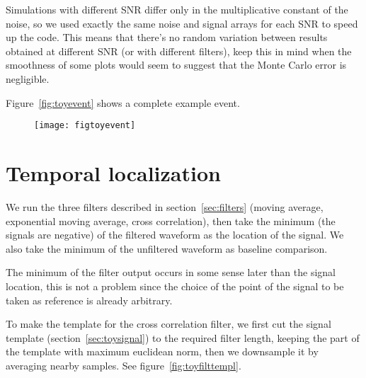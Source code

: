 
Simulations with different SNR differ only in the multiplicative constant of
the noise, so we used exactly the same noise and signal arrays for each SNR to
speed up the code. This means that there's no random variation between results
obtained at different SNR (or with different filters), keep this in mind when
the smoothness of some plots would seem to suggest that the Monte Carlo error
is negligible.

Figure~\ref{fig:toyevent} shows a complete example event.

\begin{figure}
    \hspace{-0.15\textwidth}
    \texttt{[image: figtoyevent]}
    

\end{figure}

\section{Temporal localization}

We run the three filters described in section~\ref{sec:filters} (moving
average, exponential moving average, cross correlation), then take the minimum
(the signals are negative) of the filtered waveform as the location of the
signal. We also take the minimum of the unfiltered waveform as baseline
comparison.

The minimum of the filter output occurs in some sense later than the signal
location, this is not a problem since the choice of the point of the signal to
be taken as reference is already arbitrary.

To make the template for the cross correlation filter, we first cut the signal
template (section~\ref{sec:toysignal}) to the required filter length, keeping
the part of the template with maximum euclidean norm, then we downsample it by
averaging nearby samples. See figure~\ref{fig:toyfilttempl}.

